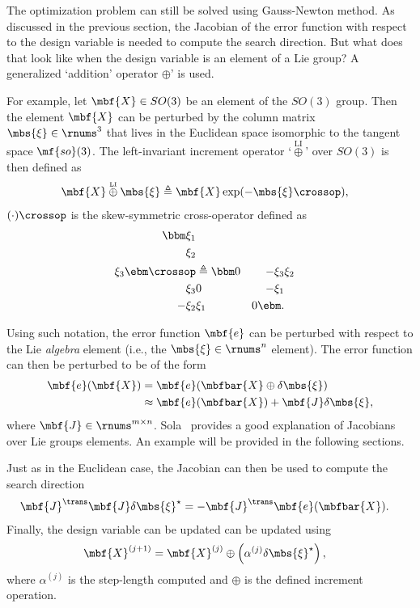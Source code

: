 \documentclass[ nobib, nofonts, notoc]{tufte-handout}
\newcommand{\liplus}{\overset{{\scriptscriptstyle\mathrm{LI}}}{\oplus}}
\begin{document}
    The optimization problem can still be solved using Gauss-Newton method. 
    As discussed in the previous section, the Jacobian of the error function with respect to the design variable is needed to compute the search direction. 
    But what does that look like when the design variable is an element of a Lie group?
    A generalized `addition' operator $\oplus$' is used. 
    
    For example, let $\mbf{X}\in SO(3)$ be an element of the $SO(3)$ group. 
    Then the element $\mbf{X}$ can be perturbed by the column matrix $\mbs{\xi}\in\rnums^{3}$ that lives in the Euclidean space isomorphic to the tangent space $\mf{so}(3)$. 
    The left-invariant increment operator `$\liplus$' over $SO(3)$ is then defined as
    \begin{align}
        \mbf{X} \liplus \mbs{\xi} &\triangleq \mbf{X}\exp(-\mbs{\xi}\crossop),
    \end{align}    
     $(\cdot)\crossop$ is the skew-symmetric cross-operator defined as \cite{Barfoot_State_2017a}
    \begin{align}
        \bbm
            \xi_{1}\\
            \xi_{2}\\
            \xi_{3}
        \ebm\crossop
        &\triangleq
        \bbm
            0 & -\xi_{3} & \xi_{2} \\ 
            \xi_{3} & 0 & -\xi_{1}\\
            -\xi_{2} & \xi_{1} & 0
        \ebm.
    \end{align}

    Using such notation, the error function $\mbf{e}$ can be perturbed with respect to the Lie \emph{algebra} element (i.e., the $\mbs{\xi}\in\rnums^{n}$ element).
    The error function can then be perturbed to be of the form
    \begin{align}
        \mbf{e}(\mbf{X}) 
        &= \mbf{e}(\mbfbar{X}\oplus \delta\mbs{\xi})\\
        &\approx \mbf{e}(\mbfbar{X}) + \mbf{J}\delta\mbs{\xi},
    \end{align}
    where $\mbf{J}\in\rnums^{m\times n}$.
    Sola~\cite{Sola_micro_2019} provides a good explanation of Jacobians over Lie groups elements.
    An example will be provided in the following sections.

    Just as in the Euclidean case, the Jacobian can then be used to compute the search direction
    \begin{align}
        \mbf{J}^{\trans}\mbf{J}\delta\mbs{\xi}^{\star} &= -\mbf{J}^{\trans}\mbf{e}(\mbfbar{X}).
    \end{align}
    Finally, the design variable can be updated can be updated using
    \begin{align}
        \mbf{X}^{(j+1)} &= \mbf{X}^{(j)}\oplus \left( \alpha^{(j)}\delta\mbs{\xi}^{\star} \right),
    \end{align}
    where $\alpha^{(j)}$ is the step-length computed and $\oplus$ is the defined increment operation.
    

    \clearpage
    
    
\end{document}
